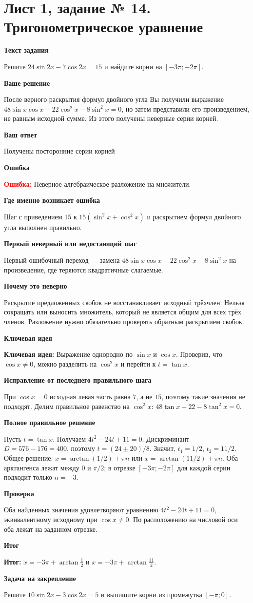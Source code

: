 \documentclass[11pt,a4paper]{article}
\newcommand{\Idea}{\textcolor{blue!60!black}{\textbf{Ключевая идея:}}}
\newcommand{\Res}{\textcolor{teal!60!black}{\textbf{Итог:}}}
\newcommand{\Heading}[2]{\par\medskip\textbf{#1}\par#2\par}
\begin{document}
\section*{Лист 1, задание № 14. Тригонометрическое уравнение}
\Heading{Текст задания}{Решите $24\sin2x-7\cos2x=15$ и найдите корни на $[-3\pi;-2\pi]$.}
\Heading{Ваше решение}{После верного раскрытия формул двойного угла Вы получили выражение $48\sin x\cos x-22\cos^2x-8\sin^2x=0$, но затем представили его произведением, не равным исходной сумме. Из этого получены неверные серии корней.}
\Heading{Ваш ответ}{Получены посторонние серии корней}
\Heading{Ошибка}{\textcolor{red}{\textbf{Ошибка:}} Неверное алгебраическое разложение на множители.}
\Heading{Где именно возникает ошибка}{Шаг с приведением $15$ к $15(\sin^2x+\cos^2x)$ и раскрытием формул двойного угла выполнен правильно.}
\Heading{Первый неверный или недостающий шаг}{Первый ошибочный переход --- замена $48\sin x\cos x-22\cos^2x-8\sin^2x$ на произведение, где теряются квадратичные слагаемые.}
\Heading{Почему это неверно}{Раскрытие предложенных скобок не восстанавливает исходный трёхчлен. Нельзя сокращать или выносить множитель, который не является общим для всех трёх членов. Разложение нужно обязательно проверять обратным раскрытием скобок.}
\Heading{Ключевая идея}{\Idea{} Выражение однородно по $\sin x$ и $\cos x$. Проверив, что $\cos x\ne0$, можно разделить на $\cos^2x$ и перейти к $t=\tan x$.}
\Heading{Исправление от последнего правильного шага}{При $\cos x=0$ исходная левая часть равна $7$, а не $15$, поэтому такие значения не подходят. Делим правильное равенство на $\cos^2x$: $48\tan x-22-8\tan^2x=0$.}
\Heading{Полное правильное решение}{Пусть $t=\tan x$. Получаем $4t^2-24t+11=0$. Дискриминант $D=576-176=400$, поэтому $t=(24\pm20)/8$. Значит, $t_1=1/2$, $t_2=11/2$. Общее решение: $x=\arctan(1/2)+\pi n$ или $x=\arctan(11/2)+\pi n$. Оба арктангенса лежат между $0$ и $\pi/2$; в отрезке $[-3\pi;-2\pi]$ для каждой серии подходит только $n=-3$.}
\Heading{Проверка}{Оба найденных значения удовлетворяют уравнению $4t^2-24t+11=0$, эквивалентному исходному при $\cos x\ne0$. По расположению на числовой оси оба лежат на заданном отрезке.}
\Heading{Итог}{\Res{} $x=-3\pi+\arctan\frac12$ и $x=-3\pi+\arctan\frac{11}{2}$.}
\Heading{Задача на закрепление}{Решите $10\sin2x-3\cos2x=5$ и выпишите корни из промежутка $[-\pi;0]$.}
\newpage
{}\label{task:2_1}
\end{document}
